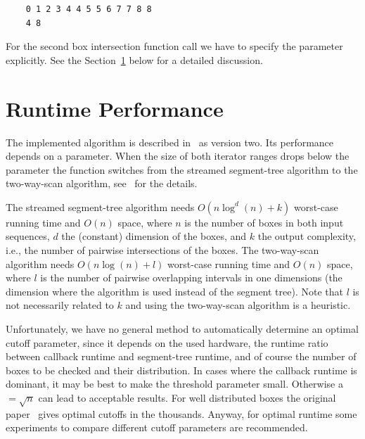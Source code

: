 \begin{verbatim}
    0 1 2 3 4 4 5 5 6 7 7 8 8 
    4 8 
\end{verbatim}

For the second box intersection function call we have to specify the
 parameter explicitly. See the
Section~\ref{sec:box-inters-performance} below for a detailed
discussion.



\section{Runtime Performance}\label{sec:box-inters-performance}

The implemented algorithm is described in~\cite{cgal:ze-fsbi-02} as
version two.  Its performance depends on a  parameter.
When the size of both iterator ranges drops below the 
parameter the function switches from the streamed segment-tree
algorithm to the two-way-scan algorithm, see~\cite{cgal:ze-fsbi-02}
for the details.

The streamed segment-tree algorithm needs $O(n \log^d (n) + k)$
worst-case running time and $O(n)$ space, where $n$ is the number of
boxes in both input sequences, $d$ the (constant) dimension of the
boxes, and $k$ the output complexity, i.e., the number of pairwise
intersections of the boxes. The two-way-scan algorithm needs $O(n \log
(n) + l)$ worst-case running time and $O(n)$ space, where $l$ is the
number of pairwise overlapping intervals in one dimensions (the
dimension where the algorithm is used instead of the segment tree).
Note that $l$ is not necessarily related to $k$ and using the
two-way-scan algorithm is a heuristic.

Unfortunately, we have no general method to automatically determine an
optimal cutoff parameter, since it depends on the used hardware, the
runtime ratio between callback runtime and segment-tree runtime, and
of course the number of boxes to be checked and their distribution. In
cases where the callback runtime is dominant, it may be best to make
the threshold parameter small. Otherwise a $=\sqrt{n}$ can
lead to acceptable results. For well distributed boxes the original
paper~\cite{cgal:ze-fsbi-02} gives optimal cutoffs in the thousands.
Anyway, for optimal runtime some experiments to compare different
cutoff parameters are recommended.

